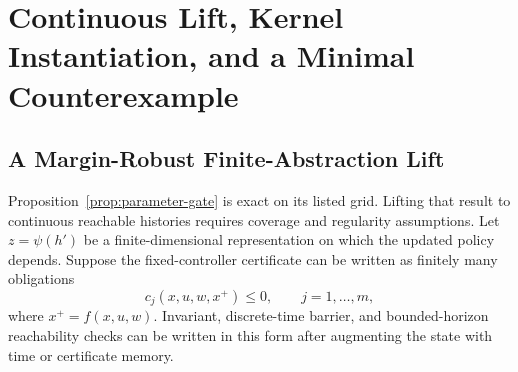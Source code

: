 \section{Continuous Lift, Kernel Instantiation, and a Minimal Counterexample}
\label{sec:appendix-lift}

\subsection{A Margin-Robust Finite-Abstraction Lift}

Proposition~\ref{prop:parameter-gate} is exact on its listed grid.  Lifting
that result to continuous reachable histories requires coverage and regularity
assumptions.  Let $z=\psi(h')$ be a finite-dimensional representation on
which the updated policy depends.  Suppose the fixed-controller certificate
can be written as finitely many obligations
\begin{equation}
 c_j(x,u,w,x^+)\le 0,\qquad j=1,\ldots,m,
\label{eq:certificate-obligation}
\end{equation}
where $x^+=f(x,u,w)$.  Invariant, discrete-time barrier, and bounded-horizon
reachability checks can be written in this form after augmenting the state
with time or certificate memory.

